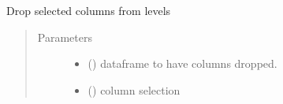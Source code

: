\documentclass[letterpaper,10pt,english]{sphinxmanual}
\begin{document}
\begin{fulllineitems}
\label{\detokenize{dalio.util:dalio.util.drop_cols}}
Drop selected columns from levels
\begin{quote}\begin{description}
\item[{Parameters}] \leavevmode\begin{itemize}
\item {} 
 () \textendash{} dataframe to have columns dropped.

\item {} 
 (\sphinxstyleliteralemphasis{\sphinxupquote{, }}\sphinxstyleliteralemphasis{\sphinxupquote{, }}) \textendash{} column selection

\end{itemize}

\end{description}\end{quote}

\end{fulllineitems}

\end{document}
